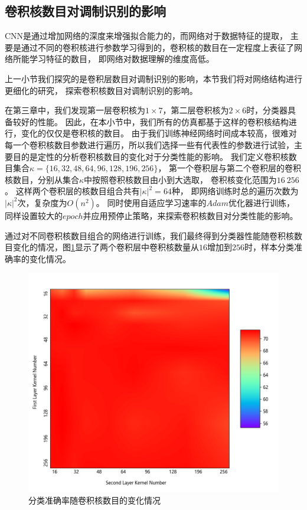 %


\subsection{卷积核数目对调制识别的影响}
CNN是通过增加网络的深度来增强拟合能力的，而网络对于数据特征的提取，
主要是通过不同的卷积核进行参数学习得到的，卷积核的数目在一定程度上表征了网络所能学习特征的数目，
即网络对数据理解的维度高低。\par
上一小节我们探究的是卷积层数目对调制识别的影响，本节我们将对网络结构进行更细化的研究，
探索卷积核数目对调制识别的影响。\par

在第三章中，我们发现第一层卷积核为$1 \times 7$，第二层卷积核为$2 \times 6$时，分类器具备较好的性能。
因此，在本小节中，我们所有的仿真都基于这样的卷积核结构进行，变化的仅仅是卷积核的数目。
由于我们训练神经网络时间成本较高，很难对每一个卷积核数目参数进行遍历，所以我们选择一些有代表性的参数进行试验，主要目的是定性的分析卷积核数目的变化对于分类性能的影响。
我们定义卷积核数目集合$\kappa =\{16, 32, 48, 64,  96, 128, 196, 256\}$，
第一个卷积层与第二个卷积层的卷积核数目，分别从集合$\kappa$中按照卷积核数目由小到大选取，
卷积核变化范围为$16~256$。
这样两个卷积层的核数目组合共有$|\kappa|^2=64$种，
即网络训练时总的遍历次数为$|\kappa|^2$次，复杂度为$O(n^2)$。
同时使用自适应学习速率的$Adam$优化器进行训练，同样设置较大的$epoch$并应用预停止策略，来探索卷积核数目对分类性能的影响。\par

通过对不同卷积核数目组合的网络进行训练，我们最终得到分类器性能随卷积核数目变化的情况，图\ref{fig_5_3}显示了两个卷积层中卷积核数量从$16$增加到$256$时，样本分类准确率的变化情况。\par
\begin{figure}[!h]
	\centering
	\includegraphics[width=0.7\linewidth, height=0.6\linewidth]{figures/chapter_5/fig_5_10}
	\caption{分类准确率随卷积核数目的变化情况}
	\label{fig_5_3}
\end{figure}

